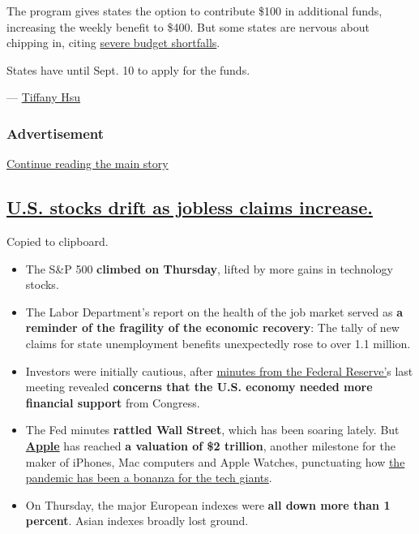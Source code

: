 The program gives states the option to contribute \$100 in additional
funds, increasing the weekly benefit to \$400. But some states are
nervous about chipping in, citing
\href{https://www.nytimes3xbfgragh.onion/2020/08/10/us/politics/virus-stimulus-congress-trump.html?action=click\&module=RelatedLinks\&pgtype=Article}{severe
budget shortfalls}.

States have until Sept. 10 to apply for the funds.

--- \href{https://www.nytimes3xbfgragh.onion/by/tiffany-hsu}{Tiffany
Hsu}

\hypertarget{advertisement-2}{%
\subsubsection{Advertisement}\label{advertisement-2}}

\protect\hyperlink{after-dfp-ad-mid3}{Continue reading the main story}

\hypertarget{us-stocks-drift-as-jobless-claims-increase}{%
\subsection{\texorpdfstring{\protect\hyperlink{us-stocks-drift-as-jobless-claims-increase}{U.S.
stocks drift as jobless claims
increase.}}{U.S. stocks drift as jobless claims increase.}}\label{us-stocks-drift-as-jobless-claims-increase}}

Copied to clipboard.

\begin{itemize}
\item
  The S\&P 500 \textbf{climbed on Thursday}, lifted by more gains in
  technology stocks.
\item
  The Labor Department's report on the health of the job market served
  as \textbf{a reminder of the fragility of the economic recovery}: The
  tally of new claims for state unemployment benefits unexpectedly rose
  to over 1.1 million.
\item
  Investors were initially cautious, after
  \href{https://www.nytimes3xbfgragh.onion/2020/08/19/business/economy/fed-meeting-minutes-coronavirus.html}{minutes
  from the Federal Reserve'}s last meeting revealed \textbf{concerns
  that the U.S. economy needed more financial support} from Congress.
\item
  The Fed minutes \textbf{rattled Wall Street}, which has been soaring
  lately. But
  \textbf{\href{https://www.nytimes3xbfgragh.onion/2020/08/19/technology/apple-2-trillion.html}{Apple}}
  has reached \textbf{a valuation of \$2 trillion}, another milestone
  for the maker of iPhones, Mac computers and Apple Watches, punctuating
  how
  \href{https://www.nytimes3xbfgragh.onion/2020/03/23/technology/coronavirus-facebook-amazon-youtube.html}{the
  pandemic has been a bonanza for the tech giants}.
\item
  On Thursday, the major European indexes were \textbf{all down more
  than 1 percent}. Asian indexes broadly lost ground.
\end{itemize}

